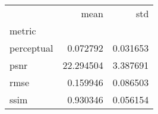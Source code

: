\begin{tabular}{lrr}
\toprule
{} &       mean &       std \\
metric     &            &           \\
\midrule
perceptual &   0.072792 &  0.031653 \\
psnr       &  22.294504 &  3.387691 \\
rmse       &   0.159946 &  0.086503 \\
ssim       &   0.930346 &  0.056154 \\
\bottomrule
\end{tabular}
